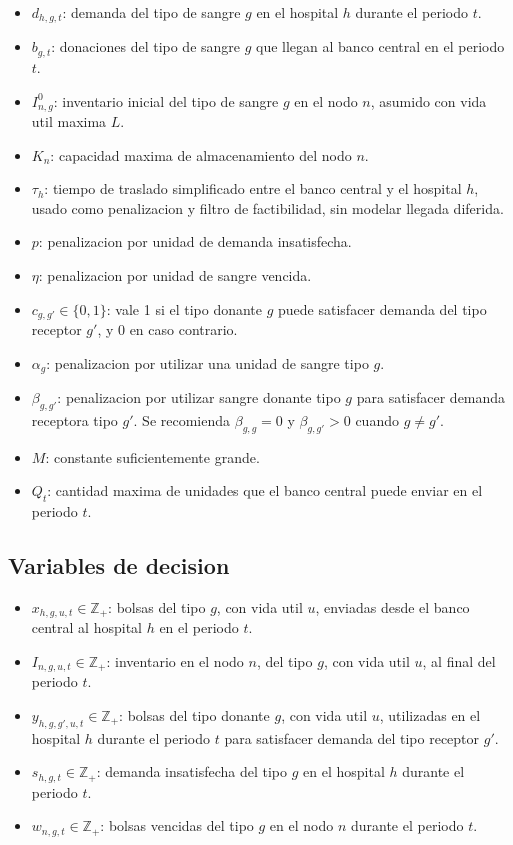 \begin{itemize}
    \item $d_{h,g,t}$: demanda del tipo de sangre $g$ en el hospital $h$ durante el periodo $t$.
    \item $b_{g,t}$: donaciones del tipo de sangre $g$ que llegan al banco central en el periodo $t$.
    \item $I^0_{n,g}$: inventario inicial del tipo de sangre $g$ en el nodo $n$, asumido con vida util maxima $L$.
    \item $K_n$: capacidad maxima de almacenamiento del nodo $n$.
    \item $\tau_h$: tiempo de traslado simplificado entre el banco central y el hospital $h$, usado como penalizacion y filtro de factibilidad, sin modelar llegada diferida.
    \item $p$: penalizacion por unidad de demanda insatisfecha.
    \item $\eta$: penalizacion por unidad de sangre vencida.
    \item $c_{g,g'} \in \{0,1\}$: vale 1 si el tipo donante $g$ puede satisfacer demanda del tipo receptor $g'$, y 0 en caso contrario.
    \item $\alpha_g$: penalizacion por utilizar una unidad de sangre tipo $g$.
    \item $\beta_{g,g'}$: penalizacion por utilizar sangre donante tipo $g$ para satisfacer demanda receptora tipo $g'$. Se recomienda $\beta_{g,g}=0$ y $\beta_{g,g'}>0$ cuando $g \neq g'$.
    \item $M$: constante suficientemente grande.
    \item $Q_t$: cantidad maxima de unidades que el banco central puede enviar en el periodo $t$.
\end{itemize}

\subsection{Variables de decision}

\begin{itemize}
    \item $x_{h,g,u,t} \in \mathbb{Z}_{+}$: bolsas del tipo $g$, con vida util $u$, enviadas desde el banco central al hospital $h$ en el periodo $t$.
    \item $I_{n,g,u,t} \in \mathbb{Z}_{+}$: inventario en el nodo $n$, del tipo $g$, con vida util $u$, al final del periodo $t$.
    \item $y_{h,g,g',u,t} \in \mathbb{Z}_{+}$: bolsas del tipo donante $g$, con vida util $u$, utilizadas en el hospital $h$ durante el periodo $t$ para satisfacer demanda del tipo receptor $g'$.
    \item $s_{h,g,t} \in \mathbb{Z}_{+}$: demanda insatisfecha del tipo $g$ en el hospital $h$ durante el periodo $t$.
    \item $w_{n,g,t} \in \mathbb{Z}_{+}$: bolsas vencidas del tipo $g$ en el nodo $n$ durante el periodo $t$.
\end{itemize}

